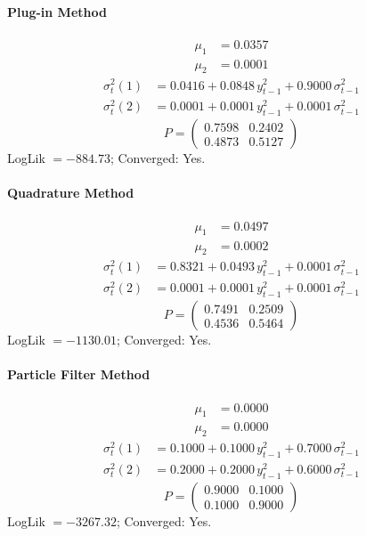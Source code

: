 \documentclass[11pt, a4paper]{article}
\begin{document}
\paragraph{Plug-in Method}
\begin{align}
\mu_{1} &= 0.0357 \\
\mu_{2} &= 0.0001
\end{align}
\begin{align}
\sigma^2_{t}(1) &= 0.0416 + 0.0848\, y_{t-1}^2 + 0.9000\, \sigma^2_{t-1} \\
\sigma^2_{t}(2) &= 0.0001 + 0.0001\, y_{t-1}^2 + 0.0001\, \sigma^2_{t-1}
\end{align}
\begin{equation}
P = \begin{pmatrix} 0.7598 & 0.2402 \\ 0.4873 & 0.5127 \end{pmatrix}
\end{equation}
LogLik $= -884.73$; Converged: Yes.

\paragraph{Quadrature Method}
\begin{align}
\mu_{1} &= 0.0497 \\
\mu_{2} &= 0.0002
\end{align}
\begin{align}
\sigma^2_{t}(1) &= 0.8321 + 0.0493\, y_{t-1}^2 + 0.0001\, \sigma^2_{t-1} \\
\sigma^2_{t}(2) &= 0.0001 + 0.0001\, y_{t-1}^2 + 0.0001\, \sigma^2_{t-1}
\end{align}
\begin{equation}
P = \begin{pmatrix} 0.7491 & 0.2509 \\ 0.4536 & 0.5464 \end{pmatrix}
\end{equation}
LogLik $= -1130.01$; Converged: Yes.

\paragraph{Particle Filter Method}
\begin{align}
\mu_{1} &= 0.0000 \\
\mu_{2} &= 0.0000
\end{align}
\begin{align}
\sigma^2_{t}(1) &= 0.1000 + 0.1000\, y_{t-1}^2 + 0.7000\, \sigma^2_{t-1} \\
\sigma^2_{t}(2) &= 0.2000 + 0.2000\, y_{t-1}^2 + 0.6000\, \sigma^2_{t-1}
\end{align}
\begin{equation}
P = \begin{pmatrix} 0.9000 & 0.1000 \\ 0.1000 & 0.9000 \end{pmatrix}
\end{equation}
LogLik $= -3267.32$; Converged: Yes.
\end{document}
